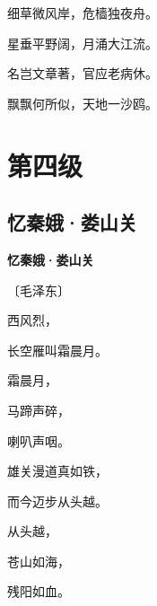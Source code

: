 \documentclass[12pt,UTF-8,openany,fontset=none]{ctexbook}
\begin{document}
    \vspace{18pt}  %

\begin{center}
    \begin{Large}

        细草微风岸，危樯独夜舟。

        星垂平野阔，月涌大江流。

        名岂文章著，官应老病休。

        飘飘何所似，天地一沙鸥。

    \end{Large}

\end{center}

\vspace{8pt}
\clearpage

\chapter{第四级}
\clearpage

\section{忆秦娥·娄山关}


\begin{center}
    {\bfseries 忆秦娥·娄山关}

    \vspace{18pt}

    \begin{large}\xuwen
        〔毛泽东〕
    \end{large}

\end{center}

    \vspace{18pt}  %

\begin{center}
    \begin{Large}

        西风烈，

        长空雁叫霜晨月。

        霜晨月，

        马蹄声碎，

        喇叭声咽。

        \vspace{18pt}  %

        雄关漫道真如铁，

        而今迈步从头越。

        从头越，

        苍山如海，

        残阳如血。

    \end{Large}

\end{center}
\end{document}
